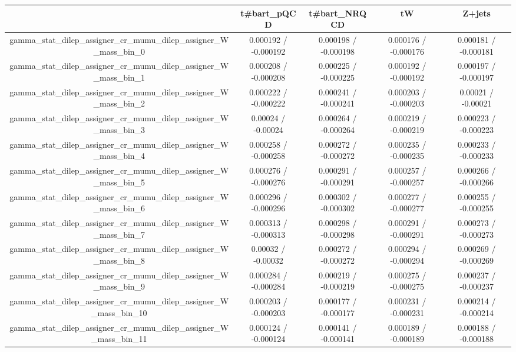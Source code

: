 \documentclass[10pt]{article}
\begin{document}
\begin{table}[htbp]
\begin{center}
\begin{tabular}{|c|c|c|c|c|}
\hline 
      & t#bar{t}_{pQCD}      & t#bar{t}_{NRQCD}      & tW      & Z+jets \\ 
\hline 
  gamma_stat_dilep_assigner_cr_mumu_dilep_assigner_W_mass_bin_0 & 0.000192 / -0.000192 & 0.000198 / -0.000198 & 0.000176 / -0.000176 & 0.000181 / -0.000181 \\ 
  gamma_stat_dilep_assigner_cr_mumu_dilep_assigner_W_mass_bin_1 & 0.000208 / -0.000208 & 0.000225 / -0.000225 & 0.000192 / -0.000192 & 0.000197 / -0.000197 \\ 
  gamma_stat_dilep_assigner_cr_mumu_dilep_assigner_W_mass_bin_2 & 0.000222 / -0.000222 & 0.000241 / -0.000241 & 0.000203 / -0.000203 & 0.00021 / -0.00021 \\ 
  gamma_stat_dilep_assigner_cr_mumu_dilep_assigner_W_mass_bin_3 & 0.00024 / -0.00024 & 0.000264 / -0.000264 & 0.000219 / -0.000219 & 0.000223 / -0.000223 \\ 
  gamma_stat_dilep_assigner_cr_mumu_dilep_assigner_W_mass_bin_4 & 0.000258 / -0.000258 & 0.000272 / -0.000272 & 0.000235 / -0.000235 & 0.000233 / -0.000233 \\ 
  gamma_stat_dilep_assigner_cr_mumu_dilep_assigner_W_mass_bin_5 & 0.000276 / -0.000276 & 0.000291 / -0.000291 & 0.000257 / -0.000257 & 0.000266 / -0.000266 \\ 
  gamma_stat_dilep_assigner_cr_mumu_dilep_assigner_W_mass_bin_6 & 0.000296 / -0.000296 & 0.000302 / -0.000302 & 0.000277 / -0.000277 & 0.000255 / -0.000255 \\ 
  gamma_stat_dilep_assigner_cr_mumu_dilep_assigner_W_mass_bin_7 & 0.000313 / -0.000313 & 0.000298 / -0.000298 & 0.000291 / -0.000291 & 0.000273 / -0.000273 \\ 
  gamma_stat_dilep_assigner_cr_mumu_dilep_assigner_W_mass_bin_8 & 0.00032 / -0.00032 & 0.000272 / -0.000272 & 0.000294 / -0.000294 & 0.000269 / -0.000269 \\ 
  gamma_stat_dilep_assigner_cr_mumu_dilep_assigner_W_mass_bin_9 & 0.000284 / -0.000284 & 0.000219 / -0.000219 & 0.000275 / -0.000275 & 0.000237 / -0.000237 \\ 
  gamma_stat_dilep_assigner_cr_mumu_dilep_assigner_W_mass_bin_10 & 0.000203 / -0.000203 & 0.000177 / -0.000177 & 0.000231 / -0.000231 & 0.000214 / -0.000214 \\ 
  gamma_stat_dilep_assigner_cr_mumu_dilep_assigner_W_mass_bin_11 & 0.000124 / -0.000124 & 0.000141 / -0.000141 & 0.000189 / -0.000189 & 0.000188 / -0.000188 \\ 

\end{tabular}
\end{center}
\end{table}
\end{document}
